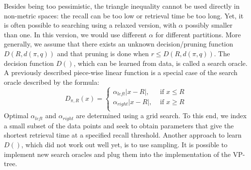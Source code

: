\documentclass[runningheads,a4paper]{llncs}
\begin{document}
{Besides being too pessimistic, the triangle inequality cannot be used directly in non-metric spaces:
the recall can be too low or retrieval time be too long.
Yet, it is often possible to searching using a relaxed version, with $\alpha$ possibly smaller than one.
In this version, we would use different $\alpha$ for different partitions.
More generally, we assume that there exists an unknown decision/pruning function $D(R, d(\pi, q))$ and
that pruning is done when $r \le D(R, d(\pi, q))$.
The decision function $D()$, which can be learned from data, is called a search oracle.
A previously described piece-wise linear function is a special case of the search oracle described by the formula:
\begin{equation}\label{EqDecFunc}
D_{\pi,R}(x) = \left\{
\begin{array}{ll}
\alpha_{left} |x - R|,  & \mbox{ if }x \le R\\
\alpha_{right} |x - R|, & \mbox{ if }x \ge R\\
\end{array}
\right.
\end{equation}
Optimal $\alpha_{left}$ and $\alpha_{right}$ are determined using a grid search.
To this end, we index a small subset of the data points
and seek to obtain parameters that give the shortest retrieval time 
at a specified recall threshold.
Another approach to learn $D()$, which did not work out well yet, is to use sampling.
It is possible to implement new search oracles and plug them into the implementation of the VP-tree.

\newpage

}
\end{document}
